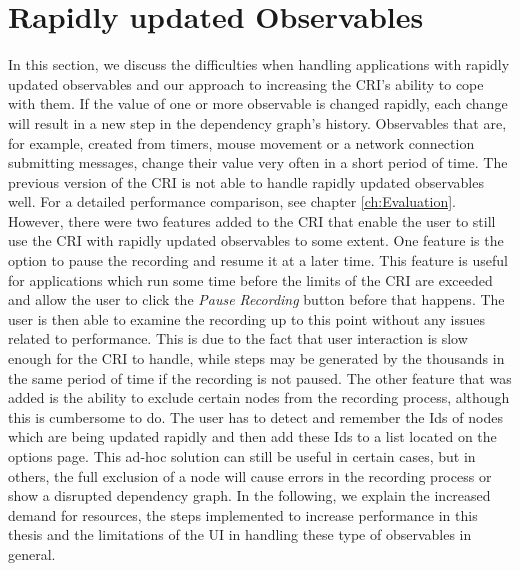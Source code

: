 \section{Rapidly updated Observables}
\label{sec:RapidlyUpdatedObservables}
In this section, we discuss the difficulties when handling applications with rapidly updated observables and our approach to increasing the CRI's ability to cope with them. If the value of one or more observable is changed rapidly, each change will result in a new step in the dependency graph's history. Observables that are, for example, created from timers, mouse movement or a network connection submitting messages, change their value very often in a short period of time. The previous version of the CRI is not able to handle rapidly updated observables well. For a detailed performance comparison, see chapter \ref{ch:Evaluation}. However, there were two features added to the CRI that enable the user to still use the CRI with rapidly updated observables to some extent. One feature is the option to pause the recording and resume it at a later time. This feature is useful for applications which run some time before the limits of the CRI are exceeded and allow the user to click the \emph{Pause Recording} button before that happens. The user is then able to examine the recording up to this point without any issues related to performance. This is due to the fact that user interaction is slow enough for the CRI to handle, while steps may be generated by the thousands in the same period of time if the recording is not paused. The other feature that was added is the ability to exclude certain nodes from the recording process, although this is cumbersome to do. The user has to detect and remember the Ids of nodes which are being updated rapidly and then add these Ids to a list located on the options page. This ad-hoc solution can still be useful in certain cases, but in others, the full exclusion of a node will cause errors in the recording process or show a disrupted dependency graph. In the following, we explain the increased demand for resources, the steps implemented to increase performance in this thesis and the limitations of the UI in handling these type of observables in general.

